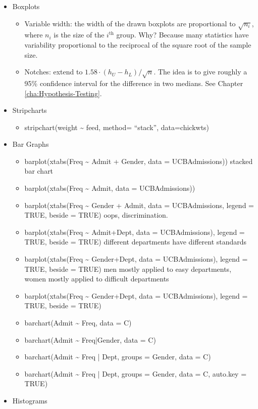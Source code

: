 \documentclass[captions=tableheading]{scrbook}
\begin{document}
\begin{itemize}
\item Boxplots
\begin{itemize}
\item Variable width: the width of the drawn boxplots are proportional to \(\sqrt{n_{i}}\), where \(n_{i}\) is the size of the \(i^{\mathrm{th}}\) group. Why? Because many statistics have variability proportional to the reciprocal of the square root of the sample size.
\item Notches: extend to \(1.58\cdot(h_{U}-h_{L})/\sqrt{n}\). The idea is to give roughly a 95\% confidence interval for the difference in two medians. See Chapter \ref{cha:Hypothesis-Testing}.
\end{itemize}
\item Stripcharts
\begin{itemize}
\item stripchart(weight \~{} feed, method= ``stack'', data=chickwts)
\end{itemize}
\item Bar Graphs
\begin{itemize}
\item barplot(xtabs(Freq \~{} Admit + Gender, data = UCBAdmissions)) stacked bar chart
\item barplot(xtabs(Freq \~{} Admit, data = UCBAdmissions))
\item barplot(xtabs(Freq \~{} Gender + Admit, data = UCBAdmissions, legend = TRUE, beside = TRUE)  oops, discrimination.
\item barplot(xtabs(Freq \~{} Admit+Dept, data = UCBAdmissions), legend = TRUE, beside = TRUE) different departments have different standards
\item barplot(xtabs(Freq \~{} Gender+Dept, data = UCBAdmissions), legend = TRUE, beside = TRUE) men mostly applied to easy departments, women mostly applied to difficult departments
\item barplot(xtabs(Freq \~{} Gender+Dept, data = UCBAdmissions), legend = TRUE, beside = TRUE)
\item barchart(Admit \~{} Freq, data = C)
\item barchart(Admit \~{} Freq|Gender, data = C)
\item barchart(Admit \~{} Freq | Dept, groups = Gender, data = C)
\item barchart(Admit \~{} Freq | Dept, groups = Gender, data = C, auto.key = TRUE)
\end{itemize}
\item Histograms
\begin{itemize}

\end{itemize}
\end{itemize}
\end{document}
